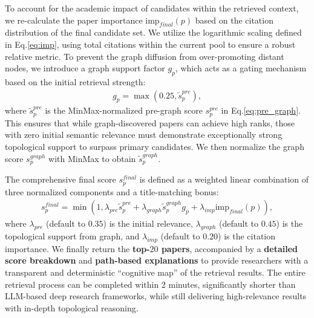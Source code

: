 To account for the academic impact of candidates within the retrieved context, we re-calculate the paper importance $\text{imp}_{final}(p)$ based on the citation distribution of the final candidate set.
We utilize the logarithmic scaling defined in Eq.\ref{eq:imp}, using total citations within the current pool to ensure a robust relative metric.
To prevent the graph diffusion from over-promoting distant nodes, we introduce a graph support factor $g_p$, which acts as a gating mechanism based on the initial retrieval strength:
\begin{align}
\label{eq:gp}
    g_p = \max(0.25, \tilde{s}_p^{pre}),
\end{align}
where $\tilde{s}_p^{pre}$ is the MinMax-normalized pre-graph score $s_p^{pre}$ in Eq.\ref{eq:pre_graph}.
This ensures that while graph-discovered papers can achieve high ranks, those with zero initial semantic relevance must demonstrate exceptionally strong topological support to surpass primary candidates.
We then normalize the graph score $s_p^{graph}$ with MinMax to obtain $\tilde{s}_p^{graph}$.

The comprehensive final score $s_p^{final}$ is defined as a weighted linear combination of three normalized components and a title-matching bonus:
\begin{align}
\label{eq:final}
    s_p^{final} = \min\left(1, \lambda_{pre}\tilde{s}_p^{pre} + \lambda_{graph}\tilde{s}_p^{graph} g_p + \lambda_{imp}\text{imp}_{final}(p)\right),
\end{align}
where $\lambda_{pre}$ (default to $0.35$) is the initial relevance, $\lambda_{graph}$ (default to $0.45$) is the topological support from graph, and $\lambda_{imp}$ (default to $0.20$) is the citation importance.
We finally return the \textbf{top-$20$ papers}, accompanied by a \textbf{detailed score breakdown} and \textbf{path-based explanations} to provide researchers with a transparent and deterministic ``cognitive map'' of the retrieval results.
The entire retrieval process can be completed within 2 minutes, significantly shorter than LLM-based deep research frameworks, while still delivering high-relevance results with in-depth topological reasoning.